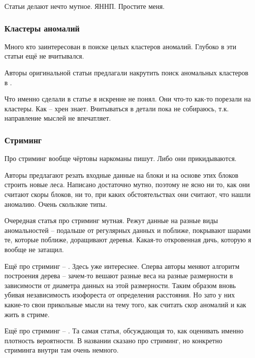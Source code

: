 \documentclass[12pt]{article}
\begin{document}
Статьи
\cite{wellsSimpleEfficientDensity2017}
\cite{cousinsCaDETInterpretableParametric2019}
делают нечто мутное. ЯННП. Простите меня.
\subsubsection*{Кластеры аномалий}

Много кто заинтересован в поиске целых кластеров аномалий. Глубоко в эти статьи
ещё не вчитывался.

Авторы оригинальной статьи предлагали накрутить поиск аномальных кластеров в
\cite{liuDetectingClusteredAnomalies2010}
. 

Что именно сделали в статье
\cite{karczmarekKMeansbasedIsolationForest2020}
я искренне не понял. Они что-то как-то порезали на кластеры. Как -- хрен знает.
Вчитываться в детали пока не собираюсь, т.к. направление мыслей не впечатляет.


\subsubsection*{Стриминг}

Про стриминг вообще чёртовы наркоманы пишут. Либо они прикидываются.

Авторы
\cite{dingAnomalyDetectionApproach2013}
предлагают резать входные данные на блоки и на основе этих блоков строить новые 
леса. Написано достаточно мутно, поэтому не ясно ни то, как они считают скоры
блоков, ни то, при каких обстоятельствах они считают, что нашли аномалию. Очень
скользкие типы.

Очередная статья про стриминг
\cite{muClassificationStreamingEmerging2017}
мутная. Режут данные на разные виды аномальностей -- подальше от регулярных
данных и поближе, покрывают шарами те, которые поближе, доращивают деревья.
Какая-то откровенная дичь, которую я вообще не затащил.

Ещё про стриминг --
\cite{guhaRobustRandomCut2016}
. Здесь уже интереснее. Сперва авторы меняют алгоритм построения дерева --
зачем-то вешают разные веса на разные размерности в зависимости от диаметра
данных на этой размерности. Таким образом вновь убивая независимость изофореста
от определения расстояния. Но зато у них какие-то свои прикольные мысли на тему того,
как считать скор аномалий и как жить в стриме.

Ещё про стриминг --
\cite{wuRSForestRapidDensity2014}
. Та самая статья, обсуждающая то, как оценивать именно плотность вероятности.
В названии сказано про стриминг, но конкретно стриминга внутри там очень немного.
\end{document}
